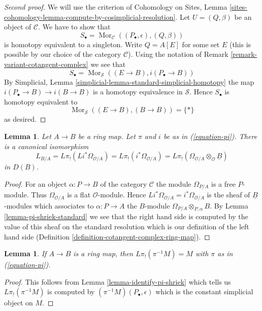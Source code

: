 \documentclass[10pt,a4paper]{amsart}
\theoremstyle{plain}
\newtheorem{lemma}[subsection]{Lemma}
\theoremstyle{definition}
\theoremstyle{remark}
\numberwithin{equation}{subsection}
\def\Mor{\mathop{\mathrm{Mor}}\nolimits}
\begin{document}
\begin{proof}[Second proof]
We will use the criterion of Cohomology on Sites, Lemma
\ref{sites-cohomology-lemma-compute-by-cosimplicial-resolution}.
Let $U = (Q, \beta)$ be an object of $\mathcal{C}$.
We have to show that
$$
S_\bullet = \Mor_\mathcal{C}((P_\bullet, \epsilon), (Q, \beta))
$$
is homotopy equivalent to a singleton. Write $Q = A[E]$ for some set $E$
(this is possible by our choice of the category $\mathcal{C}$). Using the
notation of Remark \ref{remark-variant-cotangent-complex} we see that
$$
S_\bullet = \Mor_\mathcal{S}((E \to B), i(P_\bullet \to B))
$$
By Simplicial, Lemma \ref{simplicial-lemma-standard-simplicial-homotopy}
the map $i(P_\bullet \to B) \to i(B \to B)$ is a homotopy equivalence
in $\mathcal{S}$. Hence $S_\bullet$ is homotopy equivalent to
$$
\Mor_\mathcal{S}((E \to B), (B \to B)) = \{*\}
$$
as desired.
\end{proof}

\begin{lemma}
\label{lemma-compute-cotangent-complex}
Let $A \to B$ be a ring map.  Let $\pi$ and $i$ be as in (\ref{equation-pi}).
There is a canonical isomorphism
$$
L_{B/A} = L\pi_!(Li^*\Omega_{\mathcal{O}/A}) =
L\pi_!(i^*\Omega_{\mathcal{O}/A}) =
L\pi_!(\Omega_{\mathcal{O}/A} \otimes_\mathcal{O} \underline{B})
$$
in $D(B)$.
\end{lemma}

\begin{proof}
For an object $\alpha : P \to B$ of the category $\mathcal{C}$
the module $\Omega_{P/A}$ is a free $P$-module. Thus
$\Omega_{\mathcal{O}/A}$ is a flat $\mathcal{O}$-module. Hence
$Li^*\Omega_{\mathcal{O}/A} = i^*\Omega_{\mathcal{O}/A}$ is the sheaf
of $\underline{B}$-modules which associates to $\alpha : P \to A$ the
$B$-module $\Omega_{P/A} \otimes_{P, \alpha} B$.
By Lemma \ref{lemma-pi-shriek-standard}
we see that the right hand side is computed by
the value of this sheaf on the standard resolution which is our
definition of the left hand side
(Definition \ref{definition-cotangent-complex-ring-map}).
\end{proof}

\begin{lemma}
\label{lemma-pi-lower-shriek-constant-sheaf}
If $A \to B$ is a ring map, then $L\pi_!(\pi^{-1}M) = M$
with $\pi$ as in (\ref{equation-pi}).
\end{lemma}

\begin{proof}
This follows from Lemma \ref{lemma-identify-pi-shriek} which tells us
$L\pi_!(\pi^{-1}M)$ is computed by $(\pi^{-1}M)(P_\bullet, \epsilon)$
which is the constant simplicial object on $M$.
\end{proof}
\end{document}
